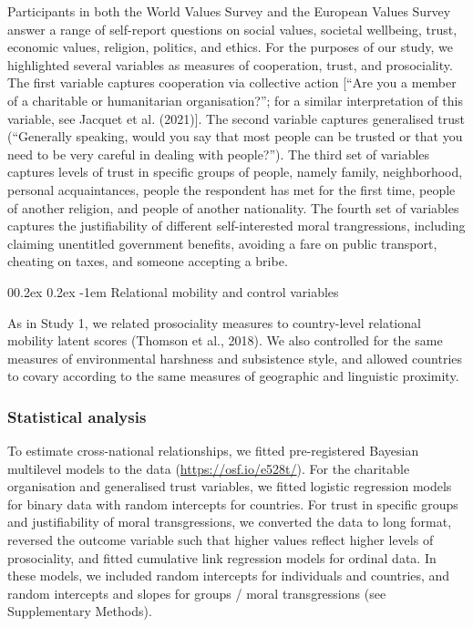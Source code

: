 \documentclass[
  man,floatsintext]{apa6}
\makeatletter
\let\oldparagraph\paragraph
\renewcommand{\paragraph}[1]{\oldparagraph{#1}\mbox{}}
\renewcommand{\paragraph}{\@startsection{paragraph}{4}{\parindent}%
  {0\baselineskip \@plus 0.2ex \@minus 0.2ex}%
  {-1em}%
  {\normalfont\normalsize\bfseries\itshape\typesectitle}}
\makeatother
\begin{document}
Participants in both the World Values Survey and the European Values Survey answer a range of self-report questions on social values, societal wellbeing, trust, economic values, religion, politics, and ethics. For the purposes of our study, we highlighted several variables as measures of cooperation, trust, and prosociality. The first variable captures cooperation via collective action {[}``Are you a member of a charitable or humanitarian organisation?''; for a similar interpretation of this variable, see Jacquet et al. (2021){]}. The second variable captures generalised trust (``Generally speaking, would you say that most people can be trusted or that you need to be very careful in dealing with people?''). The third set of variables captures levels of trust in specific groups of people, namely family, neighborhood, personal acquaintances, people the respondent has met for the first time, people of another religion, and people of another nationality. The fourth set of variables captures the justifiability of different self-interested moral trangressions, including claiming unentitled government benefits, avoiding a fare on public transport, cheating on taxes, and someone accepting a bribe.

\hypertarget{relational-mobility-and-control-variables}{%
\paragraph{Relational mobility and control variables}\label{relational-mobility-and-control-variables}}

As in Study 1, we related prosociality measures to country-level relational mobility latent scores (Thomson et al., 2018). We also controlled for the same measures of environmental harshness and subsistence style, and allowed countries to covary according to the same measures of geographic and linguistic proximity.

\hypertarget{statistical-analysis-1}{%
\subsubsection{Statistical analysis}\label{statistical-analysis-1}}

To estimate cross-national relationships, we fitted pre-registered Bayesian multilevel models to the data (\url{https://osf.io/e528t/}). For the charitable organisation and generalised trust variables, we fitted logistic regression models for binary data with random intercepts for countries. For trust in specific groups and justifiability of moral transgressions, we converted the data to long format, reversed the outcome variable such that higher values reflect higher levels of prosociality, and fitted cumulative link regression models for ordinal data. In these models, we included random intercepts for individuals and countries, and random intercepts and slopes for groups / moral transgressions (see Supplementary Methods).
\end{document}
